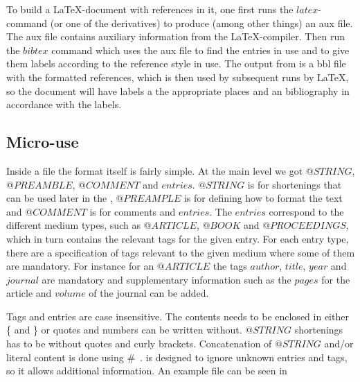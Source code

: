 To build a {\LaTeX}-document with {\bibtex} references in it, one
first runs the $latex$-command (or one of the derivatives) to produce
(among other things) an aux file.  The aux file contains auxiliary
information from the {\LaTeX}-compiler.  Then run the $bibtex$ command
which uses the aux file to find the entries in use and to give them
labels according to the reference style in use.  The output from
{\bibtex} is a bbl file with the formatted references, which is then
used by subsequent runs by {\LaTeX}, so the document will have labels
a the appropriate places and an bibliography in accordance with the
labels.


\subsection{Micro-use}

Inside a {\bibtex} file the format itself is fairly simple. At the
main level we got $@STRING$, $@PREAMBLE$, $@COMMENT$ and $entries$.
$@STRING$ is for shortenings that can be used later in the {\bibtex},
$@PREAMPLE$ is for defining how to format the text and $@COMMENT$ is
for comments and $entries$.  The $entries$ correspond to the different
medium types, such as $@ARTICLE$, $@BOOK$ and $@PROCEEDINGS$, which in
turn contains the relevant tags for the given entry.  For each entry
type, there are a specification of tags relevant to the given medium
where some of them are mandatory. For instance for an $@ARTICLE$ the
tags $author$, $title$, $year$ and $journal$ are mandatory and
supplementary information such as the $pages$ for the article and
$volume$ of the journal can be added.

Tags and entries are case insensitive. The contents needs to be
enclosed in either \{ and \} or quotes and numbers can be written
without. $@STRING$ shortenings has to be without quotes and curly
brackets.  Concatenation of $@STRING$ and/or literal content is done
using \#~\cite{bibtex_resource}.  {\bibtex} is designed to ignore
unknown entries and tags, so it allows additional information.  An
example {\bibtex} file can be seen in 

